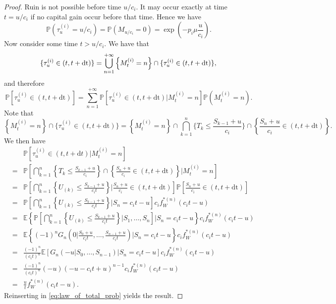 \begin{proof}
Ruin is not possible before time $u/c_i$. It may occur exactly at time $t = u/c_i$ if no capital gain occur before that time. Hence we have 
$$
\mathbb{P}(\tau_u^{(i)} = u/c_i) = \mathbb{P}(M_{u/c_i} = 0) = \exp\left(-p_i\mu \frac{u}{c_i}\right).
$$
Now consider some time $t>u/c_i$. We have that 
\begin{equation*}
\{\tau_u^{(i)}\in(t,t+\text{dt})\} = \bigcup_{n = 1}^{+\infty}\left\{M_t^{(i)} = n \right\}\cap\{\tau_u^{(i)}\in(t,t+\text{dt})\},\\
\end{equation*}
and therefore
\begin{equation}\label{eq:law_of_total_prob}
\mathbb{P}\left[\tau_u^{(i)}\in(t,t+\text{dt})\right] = \sum_{n = 1}^{+\infty}\mathbb{P}\left[\tau_u^{(i)}\in(t,t+\text{dt})\big\rvert M_t^{(i)} = n\right]\mathbb{P}\left(M_t^{(i)} = n \right).
\end{equation}
Note that 
\[
\left\{M_t^{(i)} = n \right\}\cap\{\tau_u^{(i)}\in(t,t+\text{dt})\} =\left\{M_t^{(i)} = n \right\}\cap\bigcap_{k = 1}^{n}\{T_k\leq\frac{S_{k-1}+u}{c_i}\}\cap\left\{\frac{S_n+u}{c_i}\in(t,t+\text{dt})\right\}.
\]
We then have 
\begin{eqnarray*}
&&\mathbb{P}\left[\tau_u^{(i)}\in (t,t+\text{d}t)\big\rvert M_t^{(i)} = n \right]\\
&=&\mathbb{P}\left[\bigcap_{k = 1}^{n}\left\{T_k\leq\frac{S_{k-1}+u}{c_i}\right\}\cap\left\{\frac{S_n+u}{c_i}\in(t,t+\text{dt})\right\}\big\rvert M_t^{(i)} = n \right]\\
&=&\mathbb{P}\left[\bigcap_{k = 1}^{n}\left\{
U_{(k)}\leq\frac{S_{k-1}+u}{c_i t}
\right\}
\Big\rvert\frac{S_n+u}{c_i}\in(t,t+\text{dt})\right]
\mathbb{P}\left[\frac{S_n+u}{c_i}\in(t,t+\text{dt})\right]\\
&=&\mathbb{P}\left[\bigcap_{k = 1}^{n}\left\{
U_{(k)}\leq\frac{S_{k-1}+u}{c_i t}
\right\}
\Big\rvert S_{n}=c_i t -u\right]
c_i f_{W}^{\ast(n)}(c_i t -u)\\
&=&\mathbb{E}\left\{\mathbb{P}\left[\bigcap_{k = 1}^{n}\left\{
U_{(k)}\leq\frac{S_{k-1}+u}{c_i t}
\right\}\Big\rvert S_1,\ldots, S_n\right]
\Big\rvert S_{n}=c_i t -u\right\}
c_i f_{W}^{\ast(n)}(c_i t -u)\\
&=&\mathbb{E}\left\{(-1)^nG_n\left(0\Big\rvert \frac{S_0+u}{c_i t}, \ldots, \frac{S_{n-1}+u}{c_i t}\right)
\Big\rvert S_{n}=c_i t -u\right\}
c_i f_{W}^{\ast(n)}(c_i t -u)\\
&=&\frac{(-1)^n}{(c_it)^{n} }\mathbb{E}\left[G_n\left(-u\Big\rvert S_0, \ldots, S_{n-1}\right)
\Big\rvert S_{n}=c_i t -u\right]
c_i f_{W}^{\ast(n)}(c_i t -u)\\
&=&\frac{(-1)^n}{(c_it)^{n} }(-u)(-u-c_i t + u)^{n-1}
c_i f_{W}^{\ast(n)}(c_i t -u) \\
&=& \frac{u}{ t}f_{W}^{\ast(n)}(c_i t -u) .
\end{eqnarray*}
Reinserting in \eqref{eq:law_of_total_prob} yields the result.

\end{proof}

